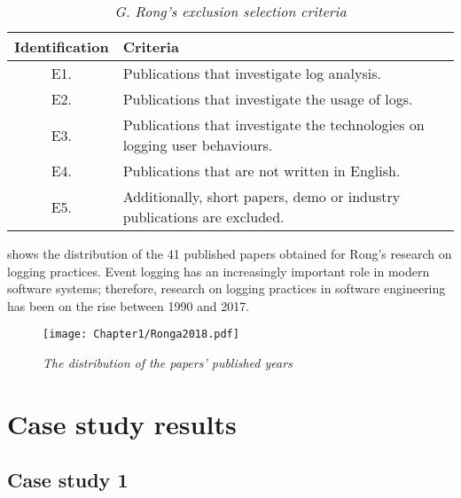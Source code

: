 \begin{table}[!htb]
	\centering
	\caption[G. Rong's exclusion selection criteria]
	{\textit{G. Rong's exclusion selection criteria \cite{Rong2018a}}}
	\label{tbl:CH1_RongExlSelectionCriteria}
	\begin{tabularx}{\textwidth}{|c|X|}
		\hline \textbf{Identification} & \textbf{Criteria} \\
		\hline E1. & Publications that investigate log analysis. \\
		\hline E2. & Publications that investigate the usage of logs. \\
		\hline E3. & Publications that investigate the technologies on logging user behaviours. \\
		\hline E4. & Publications that are not written in English. \\
		\hline E5. & Additionally, short papers, demo or industry publications are excluded. \\
		\hline
	\end{tabularx}
\end{table}

\clearpage

 shows the distribution of the 41 published papers obtained for Rong's research on logging practices. Event logging has an increasingly important role in modern software systems; therefore, research on logging practices in software engineering has been on the rise between 1990 and 2017.

\begin{figure}[!htb] %
	\centering %
	\texttt{[image: Chapter1/Ronga2018.pdf]}
	\caption[The distribution of the papers’ published years]
	{\textit{The distribution of the papers’ published years \cite{Rong2018a}}} \label{fig:PushblisedPapers}
\end{figure} 

\chapter{Case study results}\label{apx:caseStudies}

\section{Case study 1}

